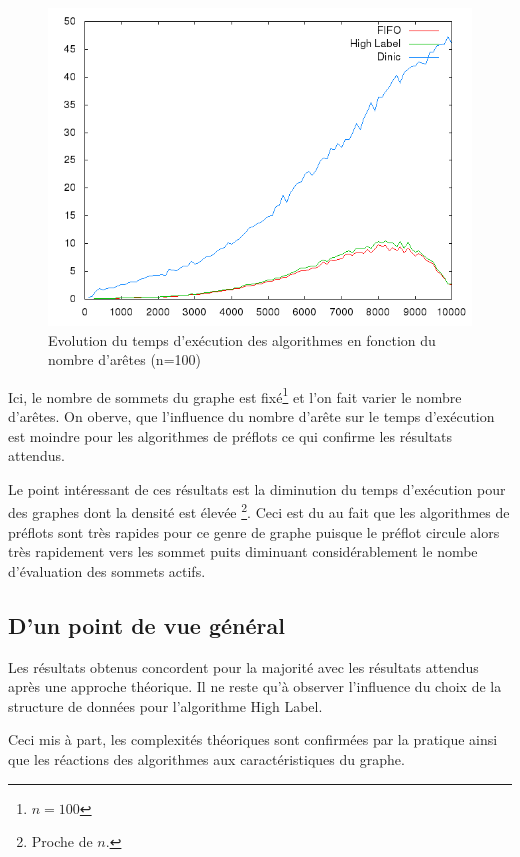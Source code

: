 \begin{figure}
	\begin{center}
		\includegraphics[scale=0.6]{../data_struct/results/result_arete.png}
	\end{center}
	\caption{Evolution du temps d'exécution des algorithmes en fonction du nombre d'arêtes (n=100)}
	\label{res_arete}
\end{figure}

Ici, le nombre de sommets du graphe est fixé\footnote{$n=100$} et l'on fait varier le nombre
d'arêtes. On oberve, que l'influence du nombre d'arête sur le temps d'exécution est moindre pour les
algorithmes de préflots ce qui confirme les résultats attendus.

Le point intéressant de ces résultats est la diminution du temps d'exécution pour des graphes dont
la densité est élevée \footnote{Proche de $n$.}. Ceci est du au fait que les algorithmes de préflots
sont très rapides pour ce genre de graphe puisque le préflot circule alors très rapidement vers les
sommet puits diminuant considérablement le nombe d'évaluation des sommets actifs.

\subsection{D'un point de vue général}

Les résultats obtenus concordent pour la majorité avec les résultats attendus après une approche
théorique. Il ne reste qu'à observer l'influence du choix de la structure de données pour
l'algorithme High Label. 

Ceci mis à part, les complexités théoriques sont confirmées par la pratique ainsi que les réactions
des algorithmes aux caractéristiques du graphe.
